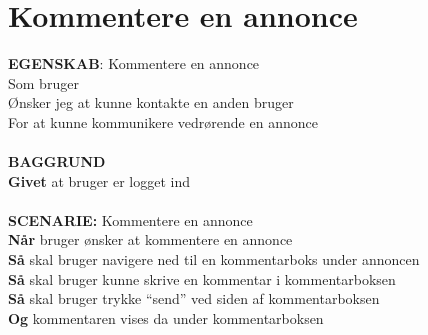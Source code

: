 \section{Kommentere en annonce}
{\color{blue}\textbf{EGENSKAB}:} Kommentere en annonce \\
Som bruger \\
Ønsker jeg at kunne kontakte en anden bruger \\
For at kunne kommunikere vedrørende en annonce\\ \\
{\color{blue}\textbf{BAGGRUND}} \\
{\color{blue}\textbf{Givet}} at bruger er logget ind \\
\\
{\color{blue}\textbf{SCENARIE:}} Kommentere en annonce \\
{\color{blue}\textbf{Når}} bruger ønsker at kommentere en annonce
 \\
{\color{blue}\textbf{Så}} skal bruger navigere ned til en kommentarboks under annoncen \\
{\color{blue}\textbf{Så}} skal bruger kunne skrive en kommentar i kommentarboksen\\
{\color{blue}\textbf{Så}} skal bruger trykke “send” ved siden af kommentarboksen \\
{\color{blue}\textbf{Og}} kommentaren vises da under kommentarboksen